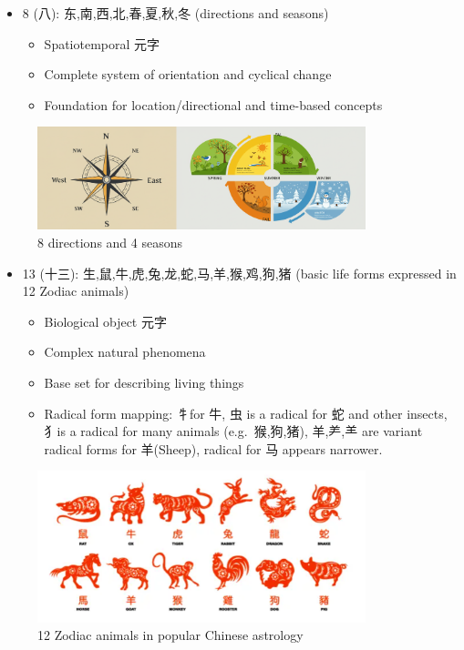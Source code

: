 \documentclass[
  11pt,
  letterpaper,
]{article}
\providecommand{\tightlist}{%
  \setlength{\itemsep}{0pt}\setlength{\parskip}{0pt}}
\begin{document}
\begin{itemize}
\tightlist
\item
  8 (八): 东,南,西,北,春,夏,秋,冬 (directions and seasons)

  \begin{itemize}
  \tightlist
  \item
    Spatiotemporal 元字
  \item
    Complete system of orientation and cyclical change
  \item
    Foundation for location/directional and time-based concepts
  \end{itemize}
\end{itemize}

\begin{figure}
\centering
\includegraphics[width=0.85\textwidth]{./images/8-directions-seasons.png}
\caption{8 directions and 4 seasons}
\end{figure}

\begin{itemize}
\tightlist
\item
  13 (十三): 生,鼠,牛,虎,兔,龙,蛇,马,羊,猴,鸡,狗,猪 (basic life forms
  expressed in 12 Zodiac animals)

  \begin{itemize}
  \tightlist
  \item
    Biological object 元字
  \item
    Complex natural phenomena
  \item
    Base set for describing living things
  \item
    Radical form mapping: 牜for 牛, 虫 is a radical for 蛇 and other
    insects, 犭is a radical for many animals (e.g.~猴,狗,猪), 羊,⺶,⺷
    are variant radical forms for 羊(Sheep), radical for 马 appears
    narrower.
  \end{itemize}
\end{itemize}

\begin{figure}
\centering
\includegraphics[width=0.85\textwidth]{./images/12-zodiac-animals.png}
\caption{12 Zodiac animals in popular Chinese astrology}
\end{figure}
\end{document}
